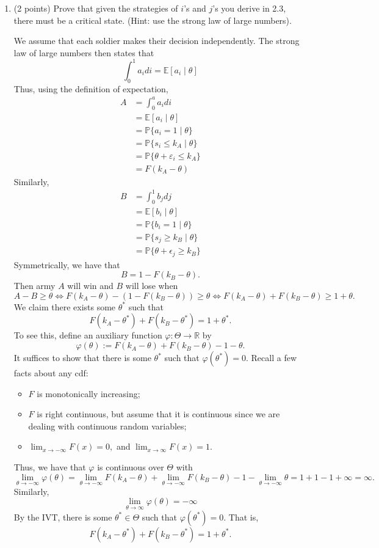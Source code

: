 \documentclass[11pt]{article}
\newcommand{\bbE}{\mathbb{E}}
\newcommand{\bbP}{\mathbb{P}}
\newcommand{\bbR}{\mathbb{R}}
\begin{document}
\begin{enumerate}
\begin{solution}
\end{solution}
    \item (2 points) Prove that given the strategies of \( i \)'s and \( j \)'s you derive in 2.3, there must be a critical state. (Hint: use the strong law of large numbers).
\begin{solution}
    We assume that each soldier makes their decision independently. The strong law of large numbers then states that 
    \[\int_0^1 a_i di = \bbE[a_i \mid \theta]\] Thus, using the definition of expectation,
    \begin{align*}
        A &= \int_0^a a_i di\\
        &= \bbE[a_i \mid \theta]\\
        &= \bbP\{a_i = 1 \mid \theta\}\\
        &= \bbP\{s_i \leq k_A \mid \theta\}\\
        &= \bbP\{\theta + \varepsilon_i \leq k_A \}\\
        &= F(k_A - \theta)
    \end{align*}
    Similarly, 
    \begin{align*}
        B &= \int_0^1 b_j dj\\
        &= \bbE[b_i \mid \theta]\\
        &= \bbP\{b_i = 1 \mid \theta\}\\
        &= \bbP\{s_j \geq k_B \mid \theta\}\\
        &= \bbP\{\theta + \epsilon_j \geq k_B\}
    \end{align*}
    Symmetrically, we have that
    \[B = 1 - F(k_B - \theta).\] Then army $A$ will win and $B$ will lose when 
    \[A - B \geq \theta \iff F(k_A - \theta) - (1 - F(k_B - \theta)) \geq \theta \iff  F(k_A - \theta) +F(k_B - \theta) \geq 1 + \theta.\]
    We claim there exists some $\theta^*$ such that 
    \[F(k_A - \theta^*) +F(k_B - \theta^*) = 1 + \theta^*.\] To see this, define an auxiliary function $\varphi: \Theta \to \bbR$ by
    \[\varphi(\theta):= F(k_A - \theta) +F(k_B - \theta) - 1 - \theta.\] It suffices to show that there is some $\theta^*$ such that $\varphi(\theta^*) = 0.$ Recall a few facts about any cdf:
    \begin{itemize}
        \item $F$ is monotonically increasing;
        \item $F$ is right continuous, but assume that it is continuous since we are dealing with continuous random variables;
        \item $\lim_{x\to -\infty}F(x) = 0,$ and $\lim_{x\to \infty} F(x) = 1.$ 
    \end{itemize}
    Thus, we have that $\varphi$ is continuous over $\Theta$ with 
    \[\lim_{\theta \to -\infty} \varphi(\theta)= \lim_{\theta \to -\infty} F(k_A - \theta) + \lim_{\theta \to -\infty} F(k_B - \theta) - 1 - \lim_{\theta \to -\infty} \theta = 1 + 1 - 1 + \infty = \infty.\] Similarly, 
    \[\lim_{\theta \to \infty} \varphi(\theta)=-\infty\]
    By the IVT, there is some $\theta^* \in \Theta$ such that $\varphi(\theta^*) = 0.$ That is,
    \[F(k_A - \theta^*) +F(k_B - \theta^*) = 1 + \theta^*.\]
    

\end{solution}
\end{enumerate}
\end{document}

